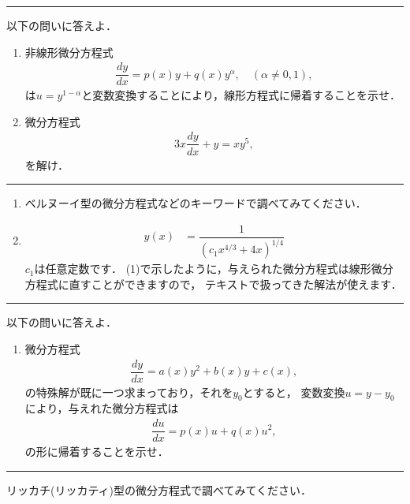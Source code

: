 \documentclass[11pt,a4]{jsarticle}
\numberwithin{equation}{section}
\begin{document}
%
\newpage
%
\hrule
\enshu
以下の問いに答えよ．
\begin{enumerate}[(1)]
  \item 非線形微分方程式
	\begin{align*}
	   \dfrac{dy}{dx} = p(x)y + q(x)y^{\alpha},\quad (\alpha \neq 0, 1),
	\end{align*}
	は$u=y^{1-\alpha}$と変数変換することにより，線形方程式に帰着することを示せ．
  \item 微分方程式
	\begin{align*}
	  3x\dfrac{dy}{dx} + y = xy^5, 
	\end{align*}
	を解け．
\end{enumerate}
%
\hrule
\vspace*{.2cm}
%
\begin{enumerate}[(1)]
\item ベルヌーイ型の微分方程式などのキーワードで調べてみてください．
\item 
\begin{align*}
y\left(x\right) & =\dfrac{1}{\left(c_{1}x^{4/3}+4x\right)^{1/4}}
\end{align*}
$c_1$は任意定数です．
(1)で示したように，与えられた微分方程式は線形微分方程式に直すことができますので，
テキストで扱ってきた解法が使えます．
\end{enumerate}
%
\newpage
%
\hrule
\enshu
以下の問いに答えよ．
\begin{enumerate}[(1)]
  \item 微分方程式
	\begin{align*}
	  \dfrac{dy}{dx} = a(x)y^2 + b(x)y + c(x), 
	\end{align*}
	の特殊解が既に一つ求まっており，それを$y_0$とすると，
	変数変換$u = y - y_0$により，与えれた微分方程式は
	\begin{align*}
	  \dfrac{du}{dx} = p(x)u + q(x)u^{2}, 
	\end{align*}
	の形に帰着することを示せ．
\end{enumerate}
%
\hrule
\vspace*{.2cm}

リッカチ(リッカティ)型の微分方程式で調べてみてください．
\end{document}
